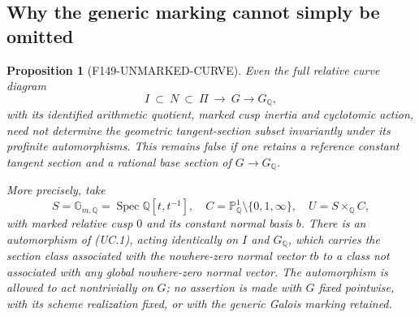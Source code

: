 \documentclass[11pt,a4paper]{article}
\newtheorem{proposition}[theorem]{Proposition}
\theoremstyle{definition}
\begin{document}
\subsection{Why the generic marking cannot simply be omitted}
\label{sec:archive-unmarked-curve}

\begin{proposition}[F149-UNMARKED-CURVE]
\label{prop:archive-unmarked-curve}
Even the full relative curve diagram
\[
 I\ \subset\ N\ \subset\ \Pi\ \longrightarrow\ G
       \longrightarrow G_{\mathbb Q},                       \tag{UC.1}
\]
with its identified arithmetic quotient, marked cusp inertia and
cyclotomic action, need not determine the geometric tangent-section
subset invariantly under its profinite automorphisms. This remains
false if one retains a reference constant tangent section and a
rational base section of $G\to G_{\mathbb Q}$.

More precisely, take
\[
 S=\mathbb G_{m,\mathbb Q}=\operatorname{Spec}\mathbb Q[t,t^{-1}],
 \quad C=\mathbb P^1_{\mathbb Q}\setminus\{0,1,\infty\},
 \quad U=S\times_{\mathbb Q}C,
\]
with marked relative cusp $0$ and its constant normal basis $b$.
There is an automorphism of (UC.1), acting identically on $I$ and
$G_{\mathbb Q}$, which carries the section class associated with the
nowhere-zero normal vector $t b$ to a class not associated with
any global nowhere-zero normal vector.
The automorphism is allowed to act nontrivially on $G$; no assertion
is made with $G$ fixed pointwise, with its scheme realization fixed,
or with the generic Galois marking retained.
\end{proposition}
\end{document}
